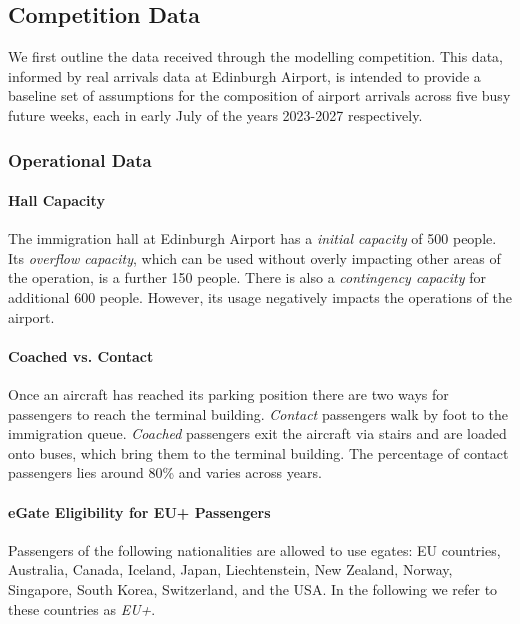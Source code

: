 \documentclass[10pt]{article}
\begin{document}
\subsection{Competition Data}

We first outline the data received through the modelling competition. This data, informed by real arrivals data at Edinburgh Airport, is intended to provide a baseline set of assumptions for the composition of airport arrivals across five busy future weeks, each in early July of the years 2023-2027 respectively.

\subsubsection{Operational Data}

\paragraph{Hall Capacity}
The immigration hall at Edinburgh Airport has a \textit{initial capacity} of 500 people. Its \textit{overflow capacity}, which can be used without overly impacting other areas of the operation, is a further 150 people. There is also a \textit{contingency capacity} for additional 600 people. However, its usage negatively impacts the operations of the airport.

\paragraph{Coached vs. Contact}
Once an aircraft has reached its parking position there are two ways for passengers to reach the terminal building. \textit{Contact} passengers walk by foot to the immigration queue. \textit{Coached} passengers exit the aircraft via stairs and are loaded onto buses, which bring them to the terminal building. The percentage of contact passengers lies around 80\% and varies across years.

\paragraph{eGate Eligibility for EU+ Passengers}
Passengers of the following nationalities are allowed to use \glspl{egate}: EU countries, Australia, Canada, Iceland, Japan, Liechtenstein, New Zealand, Norway, Singapore, South Korea, Switzerland, and the USA. In the following we refer to these countries as \textit{EU+}. 
\end{document}
